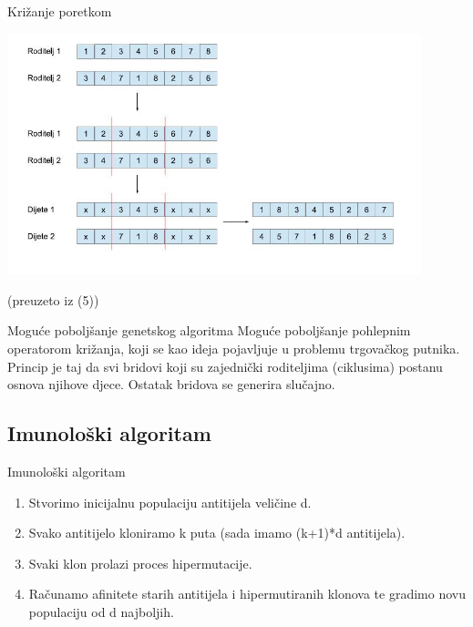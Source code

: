 \documentclass{beamer}
\begin{document}
\begin{frame}{Kri\v{z}anje poretkom}

\includegraphics[width = 12cm, height = 7cm]{krizanje_poretkom.jpg} \\
\begin{center} \tiny (preuzeto iz (5)) \end{center}


\end{frame}


\begin{frame}{Mogu\'{c}e pobolj\v{s}anje genetskog algoritma}
Mogu\'{c}e pobolj\v{s}anje pohlepnim operatorom kri\v{z}anja, koji se kao ideja pojavljuje u problemu trgova\v{c}kog putnika. \\
Princip je taj da svi bridovi koji su zajedni\v{c}ki roditeljima (ciklusima)  postanu osnova njihove djece. Ostatak bridova se generira slu\v{c}ajno.
\end{frame}

\subsection{Imunološki algoritam}
\begin{frame}{Imunološki algoritam}

\begin{enumerate}
\item Stvorimo inicijalnu populaciju antitijela veličine d.
\item Svako antitijelo kloniramo k puta (sada imamo (k+1)*d antitijela).
\item Svaki klon prolazi proces hipermutacije.
\item Računamo afinitete starih antitijela i hipermutiranih klonova te gradimo novu populaciju od d najboljih.

\end{enumerate}

\end{frame}
\end{document}
